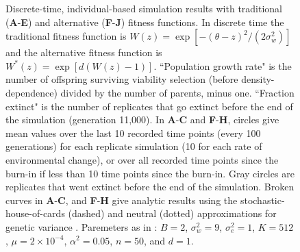 \documentclass[12pt,letterpaper]{article} %
\begin{document}
\begin{figure}[!ht]
\centering
\caption{
Discrete-time, individual-based simulation results with traditional (\textbf{A}-\textbf{E}) and alternative (\textbf{F}-\textbf{J}) fitness functions.
In discrete time the traditional fitness function is $W(z) = \exp\left[ -(\theta - z)^2 / (2\sigma_w^2) \right]$ \citep[][equation 1]{Burger1995} and the alternative fitness function is $W^*(z) = \exp\left[ d(W(z) - 1)\right]$.
``Population growth rate" is the number of offspring surviving viability selection (before density-dependence) divided by the number of parents, minus one. 
``Fraction extinct" is the number of replicates that go extinct before the end of the simulation (generation 11,000).
In \textbf{A}-\textbf{C} and \textbf{F}-\textbf{H}, circles give mean values over the last 10 recorded time points (every 100 generations) for each replicate simulation (10 for each rate of environmental change), or over all recorded time points since the burn-in if less than 10 time points since the burn-in.
Gray circles are replicates that went extinct before the end of the simulation.  
Broken curves in \textbf{A}-\textbf{C}, and \textbf{F}-\textbf{H} give analytic results using the stochastic-house-of-cards (dashed) and neutral (dotted) approximations for genetic variance \citep[equations 14 and 15 in][]{Burger1995}.
Paremeters as in \cite{Burger1995}: $B = 2$, $\sigma_w^2 = 9$, $\sigma_e^2 = 1$, $K=512$, $\mu = 2\times10^{-4}$, $\alpha^2 = 0.05$, $n=50$, and $d=1$.
}
\label{ModerateSummaryLast}
\end{figure}
\end{document}
